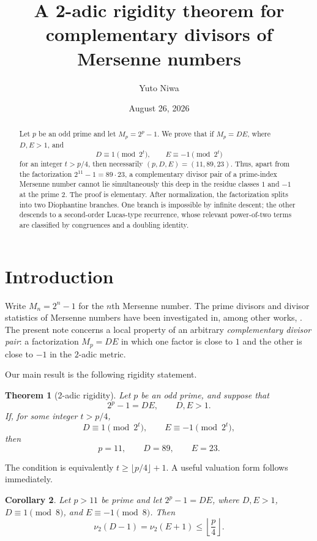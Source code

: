 \documentclass[11pt]{amsart}
\title[A 2-adic rigidity theorem]{A 2-adic rigidity theorem for complementary divisors of Mersenne numbers}
\author{Yuto Niwa}
\date{August 26, 2026}
\newtheorem{theorem}{Theorem}[section]
\newtheorem{corollary}[theorem]{Corollary}
\theoremstyle{remark}
\newcommand{\vTwo}{\nu_2}
\begin{document}
\begin{abstract}
Let $p$ be an odd prime and let $M_p=2^p-1$.  We prove that if
$M_p=DE$, where $D,E>1$, and
\[
 D\equiv 1\pmod{2^t},\qquad E\equiv -1\pmod{2^t}
\]
for an integer $t>p/4$, then necessarily
$(p,D,E)=(11,89,23)$.  Thus, apart from the factorization
$2^{11}-1=89\cdot23$, a complementary divisor pair of a prime-index
Mersenne number cannot lie simultaneously this deep in the residue
classes $1$ and $-1$ at the prime $2$.  The proof is elementary.  After
normalization, the factorization splits into two Diophantine branches.
One branch is impossible by infinite descent; the other descends to a
second-order Lucas-type recurrence, whose relevant power-of-two terms
are classified by congruences and a doubling identity.
\end{abstract}

\maketitle

\section{Introduction}

Write $M_n=2^n-1$ for the $n$th Mersenne number.  The prime divisors
and divisor statistics of Mersenne numbers have been investigated in,
among other works, \cite{Brillhart1964,Ehrman1967,Wagstaff1983,EKP1991,Cambraia2022}.
The present note concerns a local property of an arbitrary
\emph{complementary divisor pair}: a factorization $M_p=DE$ in which
one factor is close to $1$ and the other is close to $-1$ in the
$2$-adic metric.

Our main result is the following rigidity statement.

\begin{theorem}[2-adic rigidity]\label{thm:main}
Let $p$ be an odd prime, and suppose that
\[
 2^p-1=DE,\qquad D,E>1.
\]
If, for some integer $t>p/4$,
\[
 D\equiv 1\pmod{2^t},
 \qquad
 E\equiv -1\pmod{2^t},
\]
then
\[
 p=11,\qquad D=89,\qquad E=23.
\]
\end{theorem}

The condition is equivalently $t\ge \lfloor p/4\rfloor+1$.  A useful
valuation form follows immediately.

\begin{corollary}\label{cor:valuation}
Let $p>11$ be prime and let $2^p-1=DE$, where $D,E>1$,
$D\equiv1\pmod 8$, and $E\equiv-1\pmod 8$.  Then
\[
 \vTwo(D-1)=\vTwo(E+1)
 \le \left\lfloor\frac p4\right\rfloor.
\]
\end{corollary}
\end{document}
